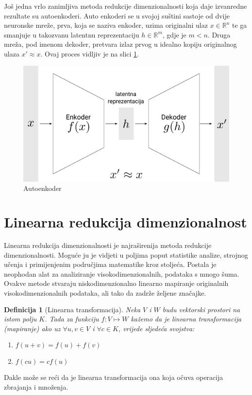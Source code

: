 \documentclass[times, utf8, diplomski]{fer}
\newtheorem{definition}{Definicija}         %
\begin{document}
\medskip
Još jedna vrlo zanimljiva metoda redukcije dimenzionalnosti koja daje izvanredne rezultate su autoenkoderi. Auto enkoderi se u svojoj suštini sastoje od dvije neuronske mreže, prva, koja se naziva enkoder, uzima originalni ulaz \(x \in \mathbb{R}^n\) te ga smanjuje u takozvanu latentnu reprezentaciju \(h \in \mathbb{R}^m\), gdje je \(m < n\). Druga mreža, pod imenom dekoder, pretvara izlaz prvog u idealno kopiju originalnog ulaza \(x' \approx x\). Ovaj proces vidljiv je na slici \ref{fig:autoencoder}.

\begin{figure}[htb]
    \centering
    \includegraphics[width=12cm]{resources/images/reduction/autoencoder.png}
    \caption{Autoenkoder}
    \label{fig:autoencoder}
\end{figure}

\section{Linearna redukcija dimenzionalnost}\label{sec:lin_reduc}

Linearna redukcija dimenzionalnosti  je najraširenija metoda redukcije dimenzionalnosti. Moguće ju je vidjeti u poljima poput statistike analize, strojnog učenja i primijenjenim područjima matematike kroz stoljeća. Postala je neophodan alat za analiziranje visokodimenzionalnih, podataka s mnogo šuma. Ovakve metode stvaraju niskodimenzionalno linearno mapiranje originalnih visokodimenzionalnih podataka, ali tako da zadrže željene značajke.

\begin{definition}[Linearna transformacija]
    Neka $V$ i $W$ budu vektorski prostori na istom polju $K$. Tada za funkciju $f: V \mapsto W$ kažemo da je linearna transformacija (mapiranje) ako uz $\forall u,v \in V$ i $\forall c \in K$, vrijede sljedeća svojstva:
    \begin{center}
        \begin{varwidth}{\textwidth}
            \begin{enumerate}
                \item $f(u + v) = f(u) + f(v)$
                \item $f(cu) = cf(u)$
            \end{enumerate}
        \end{varwidth}
    \end{center}
\end{definition}
Dakle može se reći da je linearna transformacija ona koja očuva operacija zbrajanja i množenja.
\end{document}
